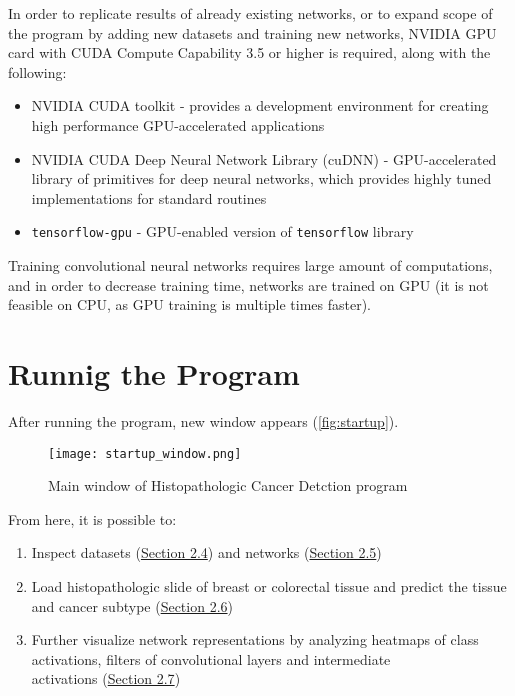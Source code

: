 	In order to replicate results of already existing networks, or to expand scope of the program by adding new datasets and training new networks, NVIDIA GPU card with CUDA Compute Capability 3.5 or higher is required, along with the following:
\begin{itemize}
	\itemsep 0em
	\item NVIDIA CUDA toolkit - provides a development environment for creating high performance GPU-accelerated applications
	\item NVIDIA CUDA Deep Neural Network Library (cuDNN) - GPU-accelerated library of primitives for deep neural networks, which provides highly tuned implementations for standard routines
	\item \texttt{tensorflow-gpu} - GPU-enabled version of \texttt{tensorflow} library
\end{itemize}
Training convolutional neural networks requires large amount of computations, and in order to decrease training time, networks are trained on GPU (it is not feasible on CPU, as GPU training is multiple times faster).

\section{Runnig the Program}

After running the program, new window appears (\textcolor{red}{\autoref{fig:startup}}).

\begin{figure}[h]
	\centering
	\texttt{[image: startup\_window.png]}
	\caption{Main window of Histopathologic Cancer Detction program}
	\label{fig:startup}
\end{figure}

From here, it is possible to:
\begin{enumerate}
	\itemsep 0em
	\item Inspect datasets (\textcolor{red}{\hyperref[inspdata]{Section 2.4}}) and networks (\textcolor{red}{\hyperref[inspnets]{Section 2.5}})
	\item Load histopathologic slide of breast or colorectal tissue and predict the tissue and cancer subtype (\textcolor{red}{\hyperref[basicuse]{Section 2.6}})
	\item Further visualize network representations by analyzing heatmaps of class activations, filters of convolutional layers and intermediate \\ activations (\textcolor{red}{\hyperref[advuse]{Section 2.7}})
\end{enumerate}

